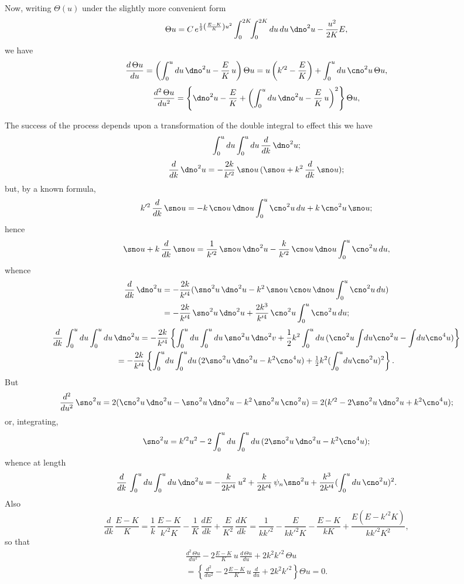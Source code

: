\documentclass[11pt,a4paper]{book}
\begin{document}
Now, writing $\Theta(u)$ under the slightly more convenient form
\[
\Theta u = C\,e^{\frac{1}{2}\left(\frac{E-K}{K}\right)u^2} \int_0^{2K} \!\!\int_0^{2K} du\,du\,\dno^2 u - \frac{u^2}{2K}E,
\]
we have
\[
\frac{d\,\Theta u}{du} = \left(\int_0^u du\,\dno^2 u - \frac{E}{K}\,u\right)\Theta u = u\left(k'^2 - \frac{E}{K}\right) + \int_0^u du\,\cno^2 u\,\Theta u,
\]
\[
\frac{d^2\,\Theta u}{du^2} = \left\{\dno^2 u - \frac{E}{K} + \left(\int_0^u du\,\dno^2 u - \frac{E}{K}\,u\right)^2\right\}\Theta u,
\]

\newpage
The success of the process depends upon a transformation of the double integral to effect this we have
\[
\int_0^u du \int_0^u du \,\frac{d}{dk}\,\dno^2 u;
\]
\[
\frac{d}{dk}\,\dno^2 u = -\frac{2k}{k'^2}\,\sno u\,(\sno u + k^2\,\frac{d}{dk}\,\sno u);
\]
but, by a known formula,
\[
k'^2\,\frac{d}{dk}\,\sno u = -k\,\cno u\,\dno u \int_0^u \cno^2 u\,du + k\,\cno^2 u\,\sno u;
\]
hence
\[
\sno u + k\,\frac{d}{dk}\,\sno u = \frac{1}{k'^2}\,\sno u\,\dno^2 u - \frac{k}{k'^2}\,\cno u\,\dno u \int_0^u \cno^2 u\,du,
\]
whence
\begin{align*}
\frac{d}{dk}\,\dno^2 u &= -\frac{2k}{k'^4}(\sno^2 u\,\dno^2 u - k^2\,\sno u\,\cno u\,\dno u \int_0^u \cno^2 u\,du) \\
&= -\frac{2k}{k'^4}\,\sno^2 u\,\dno^2 u + \frac{2k^3}{k'^4}\,\cno^2 u \int_0^u \cno^2 u\,du;
\end{align*}
\begin{multline*}
\frac{d}{dk}\,\int_0^u du \int_0^u du\,\dno^2 u = -\frac{2k}{k'^4}\left\{\int_0^u du \int_0^u du\,\sno^2 u\,\dno^2 v + \frac{1}{2}k^2 \int_0^u du\,(\cno^2 u \int \!du \cno^2 u - \int \!du \cno^4 u)\right\} \\
= -\frac{2k}{k'^4}\left\{\int_0^u \!du \int_0^u \!du\,(2\sno^2 u\,\dno^2 u - k^2\cno^4 u) + \tfrac{1}{2}k^2 (\int_0^u \!du \cno^2 u)^2\right\}.
\end{multline*}
But
\[
\frac{d^2}{du^2}\,\sno^2 u = 2(\cno^2 u\,\dno^2 u - \sno^2 u\,\dno^2 u - k^2\,\sno^2 u\,\cno^2 u) = 2(k'^2 - 2\sno^2 u\,\dno^2 u + k^2\cno^4 u);
\]
or, integrating,
\[
\sno^2 u = k'^2 u^2 - 2\int_0^u du \int_0^u du\,(2\sno^2 u\,\dno^2 u - k^2\cno^4 u);
\]
whence at length
\[
\frac{d}{dk}\,\int_0^u du \int_0^u du\,\dno^2 u = -\frac{k}{2k'^4}\,u^2 + \frac{k}{2k'^4}\,\psi_n \sno^2 u + \frac{k^3}{2k'^4}(\int_0^u du\,\cno^2 u)^2.
\]
Also
\[
\frac{d}{dk}\,\frac{E-K}{K} = \frac{1}{k}\,\frac{E-K}{k'^2K} - \frac{1}{K}\,\frac{dE}{dk} + \frac{E}{K^2}\,\frac{dK}{dk} = \frac{1}{kk'^2} - \frac{E}{kk'^2K} - \frac{E-K}{kK} + \frac{E(E-k'^2K)}{kk'^2K^2},
\]
so that
\begin{multline*}
\frac{d^2\,\Theta u}{du^2} - 2\frac{E-K}{K}\,u\,\frac{d\,\Theta u}{du} + 2k^2k'^2\,\Theta u \\
= \left\{\frac{d^2}{du^2} - 2\frac{E-K}{K}\,u\,\frac{d}{du} + 2k^2k'^2\right\}\Theta u = 0.
\end{multline*}
\end{document}
